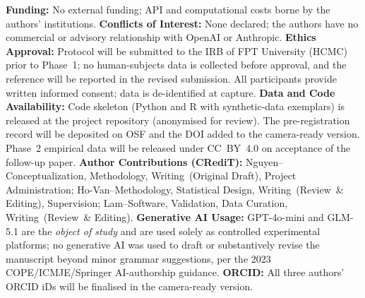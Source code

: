 \documentclass[runningheads]{llncs}
\begin{document}
\noindent\textbf{Funding:} No external funding; API and computational costs borne by the authors' institutions.
\textbf{Conflicts of Interest:} None declared; the authors have no commercial or advisory relationship with OpenAI or Anthropic.
\textbf{Ethics Approval:} Protocol will be submitted to the IRB of FPT University (HCMC) prior to Phase~1; no human-subjects data is collected before approval, and the reference will be reported in the revised submission. All participants provide written informed consent; data is de-identified at capture.
\textbf{Data and Code Availability:} Code skeleton (Python and R with synthetic-data exemplars) is released at the project repository (anonymised for review). The pre-registration record will be deposited on OSF and the DOI added to the camera-ready version. Phase~2 empirical data will be released under CC~BY~4.0 on acceptance of the follow-up paper.
\textbf{Author Contributions (CRediT):} Nguyen--Conceptualization, Methodology, Writing~(Original Draft), Project Administration; Ho-Van--Methodology, Statistical Design, Writing~(Review~\& Editing), Supervision; Lam--Software, Validation, Data Curation, Writing~(Review~\& Editing).
\textbf{Generative AI Usage:} GPT-4o-mini and GLM-5.1 are the \emph{object of study} and are used solely as controlled experimental platforms; no generative AI was used to draft or substantively revise the manuscript beyond minor grammar suggestions, per the 2023 COPE/ICMJE/Springer AI-authorship guidance.
\textbf{ORCID:} All three authors' ORCID iDs will be finalised in the camera-ready version.

{\footnotesize


}


\end{document}
